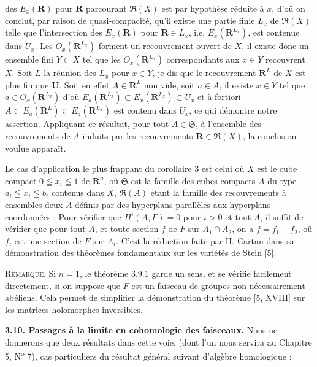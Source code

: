 
des $E_x(\mathbf R)$ pour $\mathbf R$ parcourant $\mathfrak R(X)$ est par
hypothèse réduite à $x$, d'oû on conclut, par raison de quasi-compacité,
qu'il existe une partie finie $L_x$ de $\mathfrak R(X)$ telle que
l'intersection des $E_x(\mathbf R)$ pour $\mathbf R\in L_x$, i.e.
$E_x(\mathbf R^{L_x})$, est contenue dans $U_x$. Les
$O_x(\mathbf R^{L_x})$ forment un recouvrement ouvert de $X$, il existe donc
un ensemble fini $Y\subset X$ tel que les $O_x(\mathbf R^{L_x})$
correspondants aux $x\in Y$ recouvrent $X$. Soit $L$ la réunion des $L_x$
pour $x\in Y$, je dis que le recouvrement $\mathbf R^L$ de $X$ est plus fin
que $\mathbf U$. Soit en effet $A\in\mathbf R^L$ non vide, soit $a\in A$,
il existe $x\in Y$ tel que $a\in O_x(\mathbf R^{L_x})$ d'où
$E_a(\mathbf R^{L_x})\subset E_x(\mathbf R^{L_x})\subset U_x$ et à fortiori
$A\subset E_a(\mathbf R^L)\subset E_a(\mathbf R^{L_x})$ est contenu dans
$U_x$, ce qui démontre notre assertion. Appliquant ce résultat, pour tout
$A\in\mathfrak S$, à l'ensemble des recouvrements de $A$ induits par les
recouvrements $\mathbf R\in\mathfrak R(X)$, la conclusion voulue apparaît.

Le cas d'application le plus frappant du corollaire 3 est celui où $X$ est
le cube compact $0\leqq x_i\leqq1$ de $\mathbf R^n$, oû $\mathfrak S$ est la
famille des cubes compacts $A$ du type $a_i\leqq x_i\leqq b_i$ contenus dans
$X$, $\mathfrak R(A)$ étant la famille des recouvrements à ensembles deux
$A$ définis par des hyperplans parallèles aux hyperplans coordonnées : Pour
vérifier que $H^i(A,F)=0$ pour $i>0$ et tout $A$, il suffit de vérifier que
pour tout $A$, et toute section $f$ de $F$ sur $A_1\cap A_2$, on a
$f=f_1-f_2$, oû $f_i$ est une section de $F$ sur $A_i$. C'est la réduction
faite par H. Cartan dans sa démonstration des théorèmes fondamentaux sur les
variétés de Stein [5].

\textsc{Remarque.} Si $n=1$, le théorème 3.9.1 garde un sens, et se
vérifie facilement directement, si on suppose que $F$ est un faisceau de
groupes non nécessairement abéliens. Cela permet de simplifier la
démonstration du théorème [5, XVIII] sur les matrices holomorphes inversibles.

\textbf{3.10. Passages à la limite en cohomologie des faisceaux.}
Nous ne donnerons que deux résultats dans cette voie, (dont l'un nous servira
au Chapitre 5, N\textsuperscript{o} 7), cas particuliers du résultat général
suivant d'algèbre homologique :

